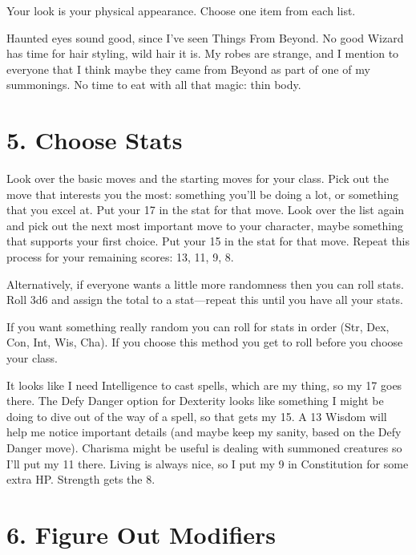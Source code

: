 Your look is your physical appearance. Choose one item from each list.

 
\startExample
Haunted eyes sound good, since I've seen Things From Beyond. No good Wizard has time for hair styling, wild hair it is. My robes are strange, and I mention to everyone that I think maybe they came from Beyond as part of one of my summonings. No time to eat with all that magic: thin body.
\stopExample
 
\section{5. Choose Stats}     
 

Look over the basic moves and the starting moves for your class. Pick out the move that interests you the most: something you'll be doing a lot, or something that you excel at. Put your 17 in the stat for that move. Look over the list again and pick out the next most important move to your character, maybe something that supports your first choice. Put your 15 in the stat for that move. Repeat this process for your remaining scores: 13, 11, 9, 8.

 

Alternatively, if everyone wants a little more randomness then you can roll stats. Roll 3d6 and assign the total to a stat—repeat this until you have all your stats.

 

If you want something really random you can roll for stats in order (Str, Dex, Con, Int, Wis, Cha). If you choose this method you get to roll before you choose your class.

 
\startExample
It looks like I need Intelligence to cast spells, which are my thing, so my 17 goes there. The Defy Danger option for Dexterity looks like something I might be doing to dive out of the way of a spell, so that gets my 15. A 13 Wisdom will help me notice important details (and maybe keep my sanity, based on the Defy Danger move). Charisma might be useful is dealing with summoned creatures so I'll put my 11 there. Living is always nice, so I put my 9 in Constitution for some extra HP. Strength gets the 8.
\stopExample
 
\section{6. Figure Out Modifiers}     
 

